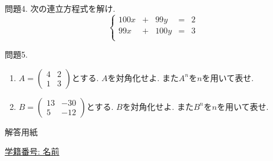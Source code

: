 \documentclass[dvipdfmx,a4paper,11pt]{article}
\theoremstyle{definition}
\begin{document}
 問題4. 次の連立方程式を解け.
$$
 \left\{ 
\begin{matrix}
100x&+&99y&= &2\\
99x&+&100y&= &3\\
\end{matrix}
\right.
$$


 問題5. 
 \begin{enumerate}
   \setlength{\parskip}{0cm} %
  \setlength{\itemsep}{0cm} %
\item 
$
A=\begin{pmatrix} 4 & 2 \\ 1 & 3 \end{pmatrix}
$とする. $A$を対角化せよ. また$A^n$を$n$を用いて表せ. 
\item $
B=\begin{pmatrix} 13 & -30 \\ 5 & -12 \end{pmatrix}
$とする. $B$を対角化せよ. また$B^n$を$n$を用いて表せ. 
 \end{enumerate}
 
 \newpage
 
  \begin{center}
 {\Large 解答用紙}
\end{center}


\begin{flushleft}
{ \large \underline{学籍番号: \hspace{4cm} 名前  \hspace{9cm}   }  }
\end{flushleft}
 

 
\end{document}
